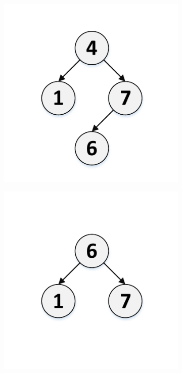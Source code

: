 \documentclass[10pt,conference,compsocconf]{IEEEtran}
\begin{document}
\begin{figure}[t]
    \begin{subfigure}{0.32\columnwidth}
        \centering
        \includegraphics[width=1\columnwidth]{./graph/bst1}
        \caption{}
        \label{fig:bst1}
    \end{subfigure}
    \hfill
    \begin{subfigure}{0.32\columnwidth}
        \centering
        \includegraphics[width=1\columnwidth]{./graph/bst2}

\end{subfigure}
\end{figure}
\end{document}

